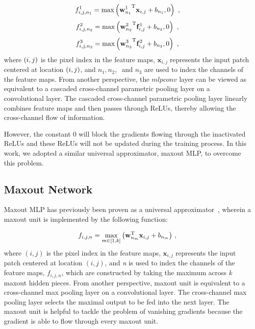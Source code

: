 \documentclass[10pt,twocolumn,letterpaper]{article}
\begin{document}
\[f^1_{i,j,n_1}={\rm max}\left({{{\mathbf w}}^1_{n_1}}^{{\rm T}}{{\mathbf x}}_{i,j}+b_{n_1},0\right)\ ,\] 
\[f^2_{i,j,n_2}={\rm max}\left({{{\mathbf w}}^2_{n_2}}^{{\rm T}}{{\mathbf f}}^1_{i,j}+b_{n_2},0\right)\ ,\]
\begin{equation}
f^3_{i,j,n_3}={\rm max}\left({{{\mathbf w}}^3_{n_3}}^{{\rm T}}{{\mathbf f}}^2_{i,j}+b_{n_3},0\right)\ ,
\end{equation}
where ${\rm (}i,j{\rm )}$ is the pixel index in the feature maps, ${{\mathbf x}}_{i,j}$ represents the input patch centered at location ${\rm (}i,j{\rm )}$, and $n_1,n_2,\ $ and $n_3$ are used to index the channels of the feature maps. From another perspective, the $mlpconv$ layer can be viewed as equivalent to a cascaded cross-channel parametric pooling layer on a convolutional layer. The cascaded cross-channel parametric pooling layer linearly combines feature maps and then passes through ReLUs, thereby allowing the cross-channel flow of information.

However, the constant 0 will block the gradients flowing through the inactivated ReLUs and these ReLUs will not be updated during the training process.
In this work, we adopted a similar universal approximator, maxout MLP, to overcome this problem.

\subsection{Maxout Network}
Maxout MLP has previously been proven as a universal approximator~\cite{goodfellow2013maxout}, wherein a maxout unit is implemented by the following function:

\begin{equation}
f_{i,j,n}={\mathop{\max }_{m\in [1,k]} \left({{\mathbf w}}^{{\rm T}}_{n_m}{{\mathbf x}}_{i,j}+b_{n_m}\right)\ } ,
\end{equation}
where ${(i,j)}$ is the pixel index in the feature maps, ${{\mathbf x}}_{i,j}$ represents the input patch centered at location ${(i,j)}$, and \textit{n} is used to index the channels of the feature maps, $f_{i,j,n}$, which are constructed by taking the maximum across \textit{k} maxout hidden pieces. From another perspective, maxout unit is equivalent to a cross-channel max pooling layer on a convolutional layer. The cross-channel max pooling layer selects the maximal output to be fed into the next layer. The maxout unit is helpful to tackle the problem of vanishing gradients because the gradient is able to flow through every maxout unit.
\end{document}
